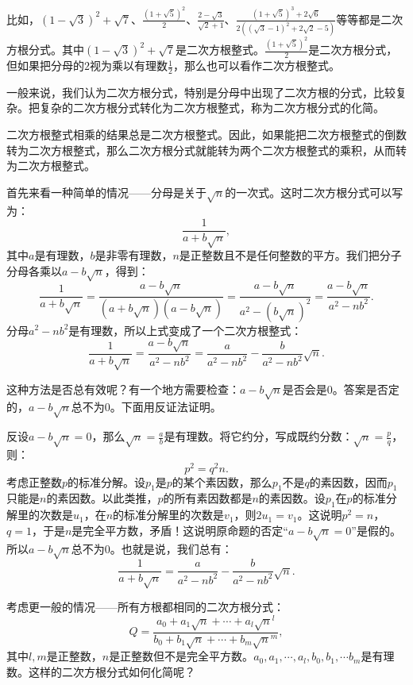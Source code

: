 \documentclass[12pt,UTF8,fontset=none]{ctexbook}
\begin{document}
比如，$\displaystyle (1 - \sqrt{3})^2 + \sqrt{7}$、$\displaystyle \frac{(1+\sqrt{5})^2}{2}$、$\displaystyle \frac{2 - \sqrt{3}}{\sqrt{2} + 1}$、$\displaystyle \frac{(1 + \sqrt{5})^3 + 2\sqrt{6}}{2((\sqrt{3} - 1)^2 + 2\sqrt{2} - 5)}$等等都是二次方根分式。其中$\displaystyle (1 - \sqrt{3})^2 + \sqrt{7}$是二次方根整式。$\displaystyle \frac{(1+\sqrt{5})^2}{2}$是二次方根分式，但如果把分母的$2$视为乘以有理数$\frac{1}{2}$，那么也可以看作二次方根整式。

一般来说，我们认为二次方根分式，特别是分母中出现了二次方根的分式，比较复杂。把复杂的二次方根分式转化为二次方根整式，称为二次方根分式的化简。

二次方根整式相乘的结果总是二次方根整式。因此，如果能把二次方根整式的倒数转为二次方根整式，那么二次方根分式就能转为两个二次方根整式的乘积，从而转为二次方根整式。

首先来看一种简单的情况——分母是关于$\sqrt{n}$的一次式。这时二次方根分式可以写为：
$$ \frac{1}{a + b\sqrt{n}} ,$$
其中$a$是有理数，$b$是非零有理数，$n$是正整数且不是任何整数的平方。我们把分子分母各乘以$a - b\sqrt{n}$，得到：
$$ \frac{1}{a + b\sqrt{n}} = \frac{a - b\sqrt{n}}{(a + b\sqrt{n})(a - b\sqrt{n})} = \frac{a - b\sqrt{n}}{a^2 - (b\sqrt{n})^2} = \frac{a - b\sqrt{n}}{a^2 - nb^2}.$$
分母$a^2 - nb^2$是有理数，所以上式变成了一个二次方根整式：
$$ \frac{1}{a + b\sqrt{n}} = \frac{a - b\sqrt{n}}{a^2 - nb^2} = \frac{a}{a^2 - nb^2} - \frac{b}{a^2 - nb^2}\sqrt{n}.$$

这种方法是否总有效呢？有一个地方需要检查：$a - b\sqrt{n}$是否会是$0$。答案是否定的，$a - b\sqrt{n}$总不为$0$。下面用反证法证明。

反设$a - b\sqrt{n}=0$，那么$\displaystyle\sqrt{n} = \frac{a}{b}$是有理数。将它约分，写成既约分数：$\displaystyle\sqrt{n} = \frac{p}{q}$，则：
$$ p^2 = q^2n.$$
考虑正整数$p$的标准分解。设$p_1$是$p$的某个素因数，那么$p_1$不是$q$的素因数，因而$p_1$只能是$n$的素因数。以此类推，$p$的所有素因数都是$n$的素因数。设$p_1$在$p$的标准分解里的次数是$u_1$，在$n$的标准分解里的次数是$v_1$，则$2u_1=v_1$。这说明$p^2 = n$，$q=1$，于是$n$是完全平方数，矛盾！这说明原命题的否定“$a - b\sqrt{n}=0$”是假的。所以$a - b\sqrt{n}$总不为$0$。也就是说，我们总有：
$$ \frac{1}{a + b\sqrt{n}} = \frac{a}{a^2 - nb^2} - \frac{b}{a^2 - nb^2}\sqrt{n}.$$

考虑更一般的情况——所有方根都相同的二次方根分式：
$$ Q = \frac{a_0 + a_1\sqrt{n} + \cdots + a_l \sqrt{n}^l}{b_0 + b_1\sqrt{n} + \cdots + b_m \sqrt{n}^m}, $$
其中$l,m$是正整数，$n$是正整数但不是完全平方数。$a_0, a_1, \cdots, a_l, b_0, b_1,\cdots b_m$是有理数。这样的二次方根分式如何化简呢？
\end{document}
